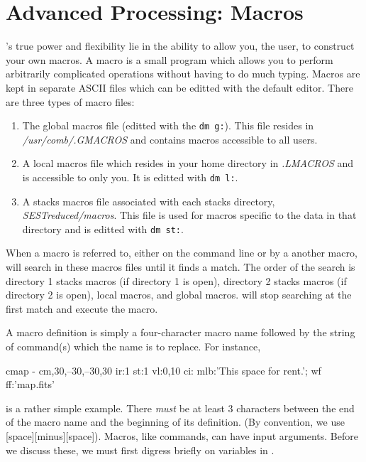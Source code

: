 \section{Advanced Processing: Macros}
\label{sec-mac}

\C's true power and flexibility lie in the ability to allow you, the user, to 
construct your own macros. 
A macro is a small program which allows you to perform arbitrarily complicated 
operations without having to do much typing.
Macros are kept in separate ASCII files which can be editted with the 
default editor. There are three types of macro files:
\begin{enumerate}
\item The global macros file (editted with the {\tt dm g:}).  This file
     resides in {\sl /usr/comb/.GMACROS\/} and contains macros 
     accessible to all users. 
\item A local macros file which resides in your home directory in {\sl .LMACROS\/}
      and is accessible to only you. It is editted with {\tt dm l:}.
\item A stacks macros file associated with each stacks directory, \eg
      {\sl SESTreduced/macros}.
      This file is used for macros specific to the data in that
      directory and is editted with {\tt dm st:}.
\end{enumerate}

When a macro is referred to, either on the command line or by a another
macro, \COMB will search in these macros files until it finds a match.
The order of the search is directory 1 stacks macros (if directory 1 is open), 
directory 2 stacks macros (if directory 2 is open), local macros, and global
macros. \COMB will stop searching at the first match and execute the macro.

A macro definition is simply a four-character macro name followed by
the string of \COMB command(s) which the name is to replace. For instance,
\begin{description}
\item cmap - cm,30,--30,--30,30 ir:1 st:1 vl:0,10 
             ci: mlb:'This space for rent.'; wf ff:'map.fits'
\end{description}
\noindent 
is a rather simple example. There {\it must} be at least 3 characters between
the end of the macro name and the beginning of its definition. (By convention, we
use [space][minus][space]). Macros, like commands, can have input arguments. 
Before we discuss these, we must first digress briefly on variables in \C.

